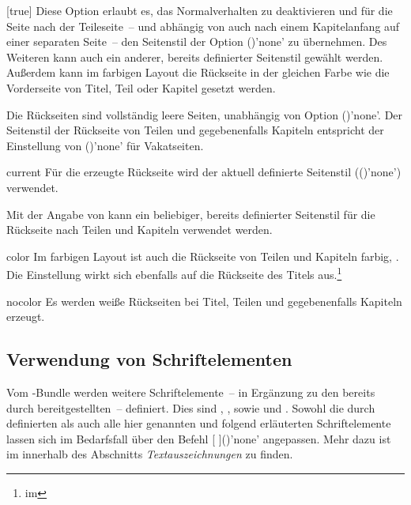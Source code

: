 \begin{Declaration*}{}
\begin{Declaration*}{}
\begin{Declaration*}{}
\begin{Declaration}{}[true]
Diese Option erlaubt es, das Normalverhalten zu deaktivieren und für die Seite 
nach der Teileseite~-- und abhängig von  auch nach einem 
Kapitelanfang auf einer separaten Seite~-- den Seitenstil der Option 
()'none' zu übernehmen. Des 
Weiteren kann auch ein anderer, bereits definierter Seitenstil gewählt werden. 
Außerdem kann im farbigen Layout die Rückseite in der gleichen Farbe wie die 
Vorderseite von Titel, Teil oder Kapitel gesetzt werden. 
\notudscrartcl
%
\begin{values}{}
\itemfalse
  Die Rückseiten sind vollständig leere Seiten, unabhängig von Option
  ()'none'.
\itemtrue*
  Der Seitenstil der Rückseite von Teilen und gegebenenfalls Kapiteln entspricht
  der Einstellung von ()'none' für 
  Vakatseiten.
\item[current]
  Für die erzeugte Rückseite wird der aktuell definierte Seitenstil 
  (()'none') verwendet.
\item[\PValueName{Seitenstil}]
  Mit der Angabe von  
  kann ein beliebiger, bereits definierter Seitenstil für die Rückseite nach 
  Teilen und Kapiteln verwendet werden.
\item[color]
  Im farbigen Layout ist auch die Rückseite von Teilen und Kapiteln farbig,  
  . Die Einstellung wirkt sich ebenfalls auf die Rückseite 
  des Titels aus.\footnote{%
     im \scrguide*%
  }%
\item[nocolor]
  Es werden weiße Rückseiten bei Titel, Teilen und gegebenenfalls Kapiteln 
  erzeugt.
\end{values}
%
\end{Declaration}



\subsection{Verwendung von Schriftelementen}
%
%
%
Vom \TUDScript-Bundle werden weitere Schriftelemente~-- in Ergänzung zu den 
bereits durch \KOMAScript{} bereitgestellten~-- definiert. Dies sind 
, ,  sowie 
und . Sowohl die durch \KOMAScript{} definierten als auch 
alle hier genannten und folgend erläuterten Schriftelemente lassen sich im 
Bedarfsfall über den Befehl [%
]()'none' angepassen. Mehr dazu ist im \scrguide innerhalb 
des Abschnitts \emph{Textauszeichnungen} zu finden.




\end{Declaration*}
\end{Declaration*}
\end{Declaration*}

